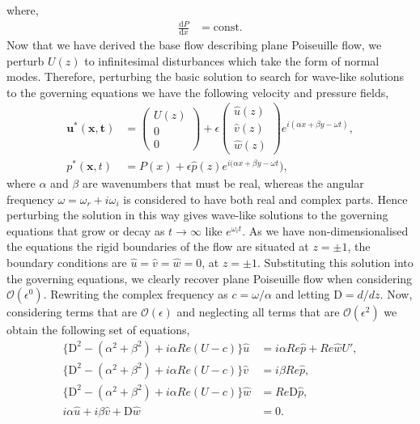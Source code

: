 \documentclass[a4paper, 12pt, twoside, openright]{article}
\numberwithin{equation}{section}
\begin{document}
where,
\begin{align}
\frac{\mathrm{d}P}{\mathrm{d}x} &= \text{const}.
\end{align}
Now that we have derived the base flow describing plane Poiseuille flow, we perturb $U(z)$ to infinitesimal disturbances which take the form of normal modes. Therefore, perturbing the basic solution to search for wave-like solutions to the governing equations we have the following velocity and pressure fields, 
\begin{align}
\mathbf{u^*(\mathbf{x},t)} &= \begin{pmatrix} U(z) \\ 0 \\ 0 \end{pmatrix} +  \epsilon \begin{pmatrix} \hat u(z) \\ \hat v(z) \\ \hat w(z) \end{pmatrix} e^{i(\alpha x + \beta y - \omega t)},  \\
p^*(\mathbf{x},t) &= P(x) + \epsilon \hat p(z) e^{i(\alpha x + \beta y - \omega t}),
\end{align}
where $\alpha$ and $\beta$ are wavenumbers that must be real, whereas the angular frequency $\omega = \omega_r + i\omega_i$ is considered to have both real and complex parts. Hence perturbing the solution in this way gives wave-like solutions to the governing equations that grow or decay as $t \rightarrow \infty $ like $e^{\omega_i t}$. As we have non-dimensionalised the equations the rigid boundaries of the flow are situated at $z=\pm1$, the boundary conditions are $\hat u = \hat v = \hat w =0$, at $z=\pm1$. Substituting this solution into the governing equations, we clearly recover plane Poiseuille flow when considering $\mathcal{O}(\epsilon^0)$. Rewriting the complex frequency as $c = \omega / \alpha$ and letting $\mathrm{D} = d/dz$. Now, considering terms that are $ \mathcal{O}(\epsilon) $ and neglecting all terms that are $\mathcal{O}(\epsilon^2)$ we obtain the following set of equations,
\begin{align}
\{\mathrm{D}^2 - (\alpha^2 + \beta^2) + i\alpha Re(U-c)\} \hat u &= i\alpha Re \hat p + Re\hat w U',\label{eq:1a}\\
\{\mathrm{D}^2 - (\alpha^2 + \beta^2) + i\alpha Re(U-c)\} \hat v &= i\beta Re \hat p ,\label{eq:1b}\\
\{\mathrm{D}^2 - (\alpha^2 + \beta^2) + i\alpha Re(U-c)\} \hat w &= Re\mathrm{D}\hat p ,\label{eq:1c}\\
i \alpha\hat u + i \beta\hat v + \mathrm{D}\hat w &= 0. \label{eq:1d}
\end{align}
\end{document}
